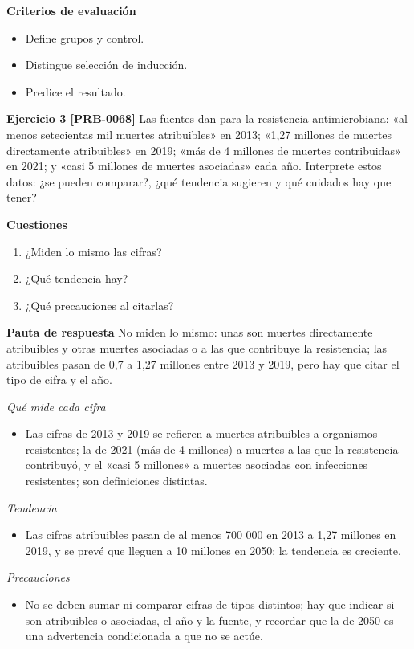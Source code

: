\documentclass{book}
\begin{document}
\noindent\textbf{Criterios de evaluación}
\begin{itemize}
\item Define grupos y control.
\item Distingue selección de inducción.
\item Predice el resultado.
\end{itemize}

\noindent\textbf{Ejercicio 3 [PRB-0068]}
Las fuentes dan para la resistencia antimicrobiana: «al menos setecientas mil muertes atribuibles» en 2013; «1,27 millones de muertes directamente atribuibles» en 2019; «más de 4 millones de muertes contribuidas» en 2021; y «casi 5 millones de muertes asociadas» cada año. Interprete estos datos: ¿se pueden comparar?, ¿qué tendencia sugieren y qué cuidados hay que tener?


\noindent\textbf{Cuestiones}
\begin{enumerate}
\item ¿Miden lo mismo las cifras?
\item ¿Qué tendencia hay?
\item ¿Qué precauciones al citarlas?
\end{enumerate}

\noindent\textbf{Pauta de respuesta}
No miden lo mismo: unas son muertes directamente atribuibles y otras muertes asociadas o a las que contribuye la resistencia; las atribuibles pasan de 0,7 a 1,27 millones entre 2013 y 2019, pero hay que citar el tipo de cifra y el año.


\noindent\textit{Qué mide cada cifra}
\begin{itemize}
\item Las cifras de 2013 y 2019 se refieren a muertes atribuibles a organismos resistentes; la de 2021 (más de 4 millones) a muertes a las que la resistencia contribuyó, y el «casi 5 millones» a muertes asociadas con infecciones resistentes; son definiciones distintas.
\end{itemize}

\noindent\textit{Tendencia}
\begin{itemize}
\item Las cifras atribuibles pasan de al menos 700 000 en 2013 a 1,27 millones en 2019, y se prevé que lleguen a 10 millones en 2050; la tendencia es creciente.
\end{itemize}

\noindent\textit{Precauciones}
\begin{itemize}
\item No se deben sumar ni comparar cifras de tipos distintos; hay que indicar si son atribuibles o asociadas, el año y la fuente, y recordar que la de 2050 es una advertencia condicionada a que no se actúe.
\end{itemize}
\end{document}
